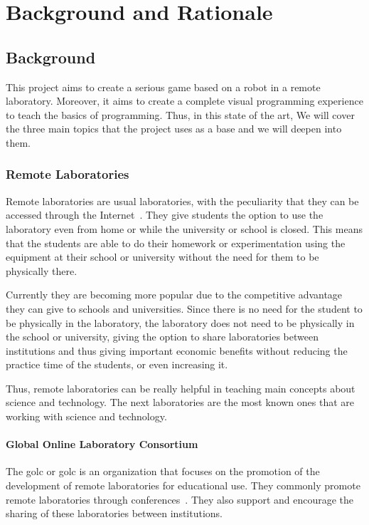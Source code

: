 \chapter{Background and Rationale}

\section{Background}

This project aims to create a serious game based on a robot in a remote laboratory. Moreover, it
aims to create a complete visual programming experience to teach the basics of programming. Thus,
in this state of the art, We will cover the three main topics that the project uses as a base and we
will deepen into them.

\subsection{Remote Laboratories}

Remote laboratories are usual laboratories, with the peculiarity that they can be accessed through
the Internet~\cite{remote_labs}. They give students the option to use the laboratory even from home
or while the university or school is closed. This means that the students are able to do their
homework or experimentation using the equipment at their school or university without the need for
them to be physically there.

Currently they are becoming more popular due to the competitive advantage they can give to schools
and universities. Since there is no need for the student to be physically in the laboratory, the
laboratory does not need to be physically in the school or university, giving the option to share
laboratories between institutions and thus giving important economic benefits without reducing
the practice time of the students, or even increasing it.

Thus, remote laboratories can be really helpful in teaching main concepts about science and
technology. The next laboratories are the most known ones that are working with science and
technology.

\subsubsection{Global Online Laboratory Consortium}

The \acrlong{golc} or \acrshort{golc} is an organization that focuses on the promotion of the
development of remote laboratories for educational use. They commonly promote remote laboratories
through conferences~\cite{golc1st}. They also support and encourage the sharing of these
laboratories between institutions.


